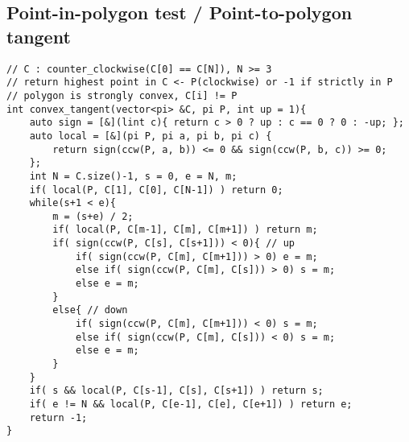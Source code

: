 \documentclass[landscape, 8pt, a4paper, oneside, twocolumn]{extarticle}
\begin{document}
\subsection{Point-in-polygon test / Point-to-polygon tangent}
\begin{verbatim}
// C : counter_clockwise(C[0] == C[N]), N >= 3
// return highest point in C <- P(clockwise) or -1 if strictly in P
// polygon is strongly convex, C[i] != P
int convex_tangent(vector<pi> &C, pi P, int up = 1){
	auto sign = [&](lint c){ return c > 0 ? up : c == 0 ? 0 : -up; };
	auto local = [&](pi P, pi a, pi b, pi c) {
		return sign(ccw(P, a, b)) <= 0 && sign(ccw(P, b, c)) >= 0;
	};
	int N = C.size()-1, s = 0, e = N, m;
	if( local(P, C[1], C[0], C[N-1]) ) return 0;
	while(s+1 < e){
		m = (s+e) / 2;
		if( local(P, C[m-1], C[m], C[m+1]) ) return m;
		if( sign(ccw(P, C[s], C[s+1])) < 0){ // up
			if( sign(ccw(P, C[m], C[m+1])) > 0) e = m;
			else if( sign(ccw(P, C[m], C[s])) > 0) s = m;
			else e = m;
		}
		else{ // down
			if( sign(ccw(P, C[m], C[m+1])) < 0) s = m;
			else if( sign(ccw(P, C[m], C[s])) < 0) s = m;
			else e = m;
		}
	}
	if( s && local(P, C[s-1], C[s], C[s+1]) ) return s;
	if( e != N && local(P, C[e-1], C[e], C[e+1]) ) return e;
	return -1;
}
\end{verbatim}
\end{document}
